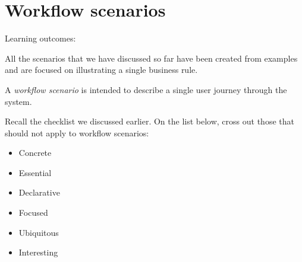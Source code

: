 \chapter*{Workflow scenarios}

\ifnotes

    Learning outcomes:

\fi

\ifcontent

    All the scenarios that we have discussed so far have been created from examples and are focused on illustrating a single business rule.
    

    A \emph{workflow scenario} is intended to describe a single user journey through the system. 
    
    Recall the checklist we discussed earlier. On the list below, cross out those that should not apply to workflow scenarios:
     
    \begin{itemize}
        \item Concrete
        \item Essential
        \item Declarative
        \item Focused
        \item Ubiquitous
        \item Interesting
    \end{itemize}
    

\fi